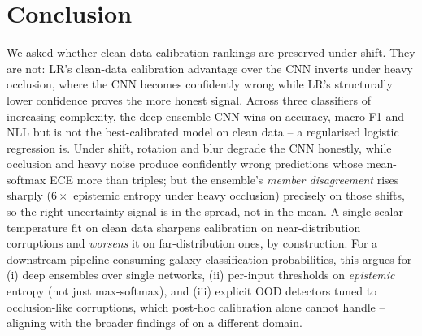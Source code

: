 \documentclass[10pt,a4paper]{article}
\begin{document}
\section{Conclusion}
We asked whether clean-data calibration rankings are preserved under shift. They are not: LR's clean-data calibration advantage over the CNN inverts under heavy occlusion, where the CNN becomes confidently wrong while LR's structurally lower confidence proves the more honest signal. Across three classifiers of increasing complexity, the deep ensemble CNN wins on accuracy, macro-F1 and NLL but is not the best-calibrated model on clean data -- a regularised logistic regression is. Under shift, rotation and blur degrade the CNN honestly, while occlusion and heavy noise produce confidently wrong predictions whose mean-softmax ECE more than triples; but the ensemble's \emph{member disagreement} rises sharply ($6{\times}$ epistemic entropy under heavy occlusion) precisely on those shifts, so the right uncertainty signal is in the spread, not in the mean. A single scalar temperature fit on clean data sharpens calibration on near-distribution corruptions and \emph{worsens} it on far-distribution ones, by construction. For a downstream pipeline consuming galaxy-classification probabilities, this argues for (i) deep ensembles over single networks, (ii) per-input thresholds on \emph{epistemic} entropy (not just max-softmax), and (iii) explicit OOD detectors tuned to occlusion-like corruptions, which post-hoc calibration alone cannot handle -- aligning with the broader findings of \citet{ovadia2019} on a different domain.

\renewcommand{\refname}{\vspace{-1.3em}}
\end{document}
